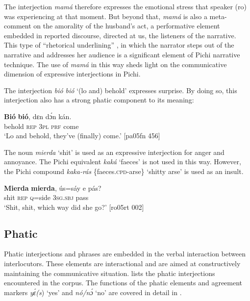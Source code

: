 The interjection \textit{mamá} therefore expresses the emotional stress that speaker (ro) was experiencing at that moment. But beyond that, \textit{mamá} is also a meta-comment on the amorality of the husband’s act, a performative element embedded in reported discourse, directed at us, the listeners of the narrative. This type of “rhetorical underlining” \citep[39]{Longacre1996}, in which the narrator steps out of the narrative and addresses her audience is a significant element of Pichi narrative technique. The use of \textit{mamá} in this way sheds light on the communicative dimension of expressive interjections in Pichi.


The interjection \textit{bió bió} ‘(lo and) behold’ expresses surprise. By doing so, this interjection also has a strong phatic component to its meaning: 



\ea%
    \label{ex:key:1646}
    \gll \textbf{Bió}    \textbf{bió},  dɛn  dɔ́n  kán.\\
behold  \textsc{rep}  \textsc{3pl}  \textsc{prf}  come\\

\glt ‘Lo and behold, they’ve (finally) come.’ [pa05fn 456]
\z

The  noun \textit{mierda} ‘shit’ is used as an expressive interjection for anger and annoyance. The Pichi equivalent \textit{kaká} ‘faeces’ is not used in this way. However, the Pichi compound \textit{kaka-rás} \{faeces.\textsc{cpd}{}-arse\} ‘shitty arse’ is used as an insult.


\ea%
    \label{ex:key:1647}
    \gll \textbf{Mierda}  \textbf{mierda},  ús=sáy  e    pás?\\
shit    \textsc{rep}    \textsc{q}=side  \textsc{3sg.sbj}  pass\\

\glt ‘Shit, shit, which way did she go?’ [ro05rt 002]
\z

\subsection{Phatic}\label{sec:12.2.2}

Phatic interjections and phrases are embedded in the verbal interaction between interlocutors. These elements are interactional and are aimed at constructively maintaining the communicative situation.  lists the phatic interjections encountered in the corpus. The functions of the phatic elements and agreement markers \textit{yɛ́(s}) ‘yes’ and \textit{nó/nɔ́} ‘no’ are covered in detail in .

